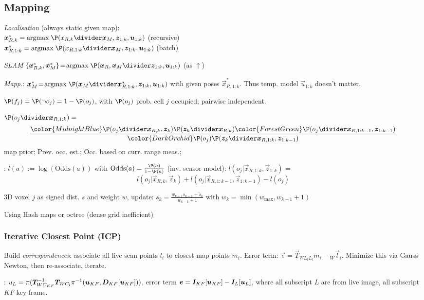 \subsection{Mapping}
 \textit{Localisation} {\scriptsize (always static given map)}:\\
$\vec{x}^*_{R, k} = \text{argmax}\; \P(x_{R, k} \divider \vec{x}_M, \vec{z}_{1 : k}, \vec{u}_{1 : k})$ (recursive)\\
$\vec{x}^*_{R, 1:k} = \text{argmax}\; \P(x_{R, 1:k} \divider \vec{x}_M, \vec{z}_{1 : k}, \vec{u}_{1 : k})$ (batch)

\textit{SLAM} $\{ \vec{x}^*_{R, k}, \vec{x}^*_M \} \! = \! \text{argmax}\; \P(\vec{x}_R, \vec{x}_M \divider \vec{z}_{1 : k}, \vec{u}_{1 : k})$ (as $\uparrow$)

\textit{Mapp.}: $\vec{x}_M^* \! = \! \text{argmax}\; \P(\vec{x}_M \divider \vec{x}^*_{R, 1:k}, \vec{z}_{1 : k}, \vec{u}_{1 : k})$ with given poses $\vec{x}^*_{R, 1:k}$.
Thus temp. model $\vec{u}_{1:k}$ doesn't matter.

 $\P(f_j) = \P(\neg o_j) = 1 - \P(o_j)$, with $\P(o_j)$ prob. cell $j$ occupied; pairwise independent.

 $\P(o_j \divider \vec{x}_{R, 1:k}) =$
\[
    \frac{
        {\color{MidnightBlue} \P(o_j \divider \vec{x}_{R, k}, \vec{z}_k)}
        \P(\vec{z}_k \divider \vec{x}_{R, k})
        {\color{ForestGreen} \P(o_j \divider \vec{x}_{R, 1 : k - 1}, \vec{z}_{1 : k - 1})}
    }{{\color{DarkOrchid} \P(o_j)} \P(\vec{z}_k \divider \vec{x}_{R, 1 : k}, \vec{z}_{1 : k - 1})}
\]
{\color{DarkOrchid} map prior}; {\color{ForestGreen} Prev. occ. est.}; {\color{MidnightBlue} Occ. based on curr. range meas.};

:
$l(a) := \log(\text{Odds}(a))$ with $\text{Odds}(a) = \frac{\P(a)}{1 - \P(a)}$ (inv. sensor model):
$l(o_j | \vec{x}_{R, 1 : k}, \vec{z}_{1 : k})$ =
\[
    l(o_j | \vec{x}_{R, k}, \vec{z}_k) + l(o_j | \vec{x}_{R, 1 : k - 1}, \vec{z}_{1 : k - 1}) - l(o_j)
\]

 3D voxel $j$ as signed dist. $s$ and weight $w$, update:
$\displaystyle s_k = \frac{w_{k - 1} s_{k - 1} + \tilde{s}_k}{w_{k - 1} + 1}$ with $w_k = \min(w_{\max}, w_{k - 1} + 1)$

 Using Hash maps or octree (dense grid inefficient)


\subsubsection{Iterative Closest Point (ICP)}
Build \textit{correspondences}: associate all live scan points $l_i$ to closest map points $m_i$. Error term:
$\vec{e} = \vec{T}_{W L_l} {_{L_l}}m_i - {_W}\vec{l}_i$.
Minimize this via Gauss-Newton, then re-associate, iterate.

: $u_{L} = \pi(\bm{T}_{WC_{KF}}^{-1} \bm{T}_{WC_l} \pi^{-1}(\bm{u}_{KF}, \bm{D}_{KF}[\bm{u}_{KF}]))$,
error term $\bm{e} = \bm{I}_{KF}[\bm{u}_{KF}] - \bm{I}_L[\bm{u}_{L}]$,
where all subscript $L$ are from live image, all subscript $KF$ key frame.
